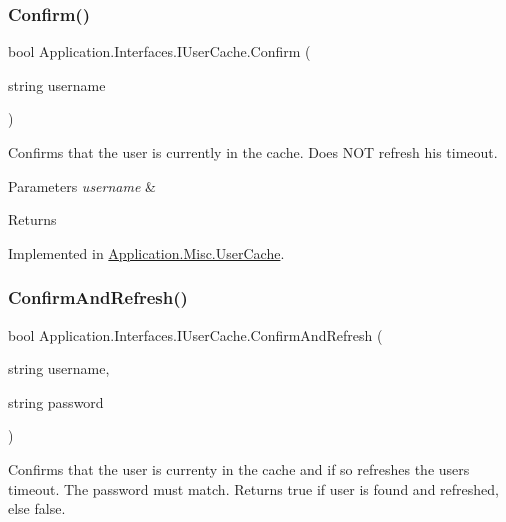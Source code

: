\subsubsection{\texorpdfstring{Confirm()}{Confirm()}}
{\footnotesize\ttfamily bool Application.\+Interfaces.\+I\+User\+Cache.\+Confirm (\begin{DoxyParamCaption}\item[{string}]{username }\end{DoxyParamCaption})}



Confirms that the user is currently in the cache. Does N\+OT refresh his timeout. 


\begin{DoxyParams}{Parameters}
{\em username} & \\
\hline
\end{DoxyParams}
\begin{DoxyReturn}{Returns}

\end{DoxyReturn}


Implemented in \mbox{\hyperlink{class_application_1_1_misc_1_1_user_cache_a77b10de2cba0f07aa9af6fd5ad53e2c6}{Application.\+Misc.\+User\+Cache}}.

\mbox{\label{interface_application_1_1_interfaces_1_1_i_user_cache_a3516a7abf1f40f9ddd10243cad03bb65}} 
\subsubsection{\texorpdfstring{Confirm\+And\+Refresh()}{ConfirmAndRefresh()}}
{\footnotesize\ttfamily bool Application.\+Interfaces.\+I\+User\+Cache.\+Confirm\+And\+Refresh (\begin{DoxyParamCaption}\item[{string}]{username,  }\item[{string}]{password }\end{DoxyParamCaption})}



Confirms that the user is currenty in the cache and if so refreshes the user\textquotesingle{}s timeout. The password must match. Returns true if user is found and refreshed, else false. 


